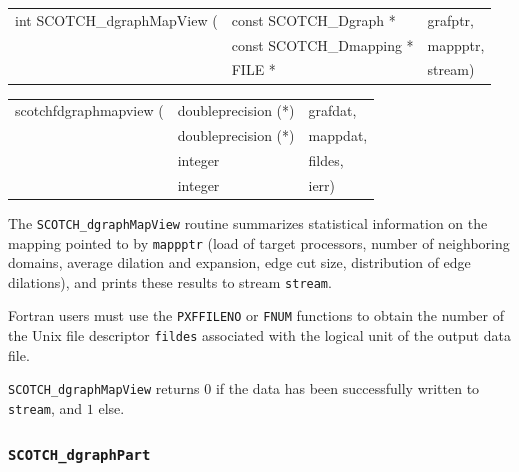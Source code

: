 \begin{itemize}
\progsyn

{\tt\begin{tabular}{l@{}ll}
int SCOTCH\_dgraphMapView ( & const SCOTCH\_Dgraph *   & grafptr, \\
                            & const SCOTCH\_Dmapping * & mappptr, \\
                            & FILE *                   & stream)
\end{tabular}}

{\tt\begin{tabular}{l@{}ll}
scotchfdgraphmapview ( & doubleprecision (*) & grafdat, \\
                       & doubleprecision (*) & mappdat, \\
                       & integer             & fildes,  \\
                       & integer             & ierr)
\end{tabular}}

\progdes

The {\tt SCOTCH\_dgraphMapView} routine summarizes statistical
information on the mapping pointed to by {\tt mappptr} (load of target
processors, number of neighboring domains, average dilation and
expansion, edge cut size, distribution of edge dilations), and prints
these results to stream {\tt stream}.

Fortran users must use the {\tt PXFFILENO} or {\tt FNUM} functions to
obtain the number of the Unix file descriptor {\tt fildes} associated
with the logical unit of the output data file.

\progret

{\tt SCOTCH\_dgraphMapView} returns $0$ if the data has been
successfully written to {\tt stream}, and $1$ else.
\end{itemize}

\subsubsection{{\tt SCOTCH\_dgraphPart}}

